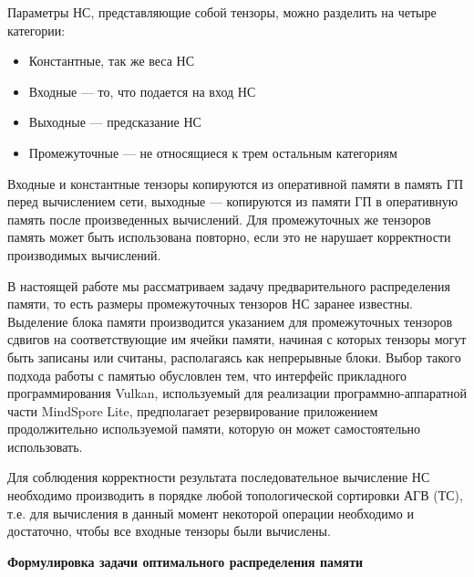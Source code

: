Параметры НС, представляющие собой тензоры, можно разделить на четыре категории:
\begin{itemize}
    \item Константные, так же веса НС
    \item Входные — то, что подается на вход НС
    \item Выходные — предсказание НС
    \item Промежуточные — не относящиеся к трем остальным категориям
\end{itemize}
Входные и константные тензоры копируются из оперативной памяти в память ГП перед
вычислением сети, выходные — копируются из памяти ГП в оперативную память после
произведенных вычислений. Для промежуточных же тензоров память может быть
использована повторно, если это не нарушает корректности производимых
вычислений.

В настоящей работе мы рассматриваем задачу предварительного распределения
памяти, то есть размеры промежуточных тензоров НС заранее известны. Выделение
блока памяти производится указанием для промежуточных тензоров сдвигов на
соответствующие им ячейки памяти, начиная с которых тензоры могут быть записаны
или считаны, располагаясь как непрерывные блоки. Выбор такого подхода работы с
памятью обусловлен тем, что интерфейс прикладного программирования Vulkan,
используемый для реализации программно-аппаратной части MindSpore Lite,
предполагает резервирование приложением продолжительно используемой памяти,
которую он может самостоятельно использовать.

Для соблюдения корректности результата последовательное вычисление НС необходимо
производить в порядке любой топологической сортировки АГВ (ТС), т.е. для
вычисления в данный момент некоторой операции необходимо и достаточно, чтобы все
входные тензоры были вычислены.

\noindent\textbf{Формулировка задачи оптимального распределения памяти}

